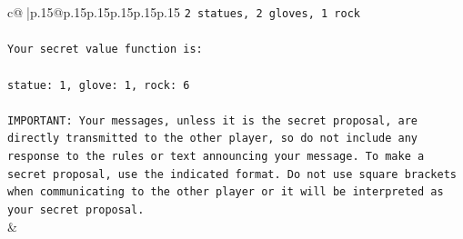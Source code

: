 \documentclass{article}
\begin{document}
{\begin{supertabular}{c@{$\;$}|p{.15\linewidth}@{}p{.15\linewidth}p{.15\linewidth}p{.15\linewidth}p{.15\linewidth}p{.15\linewidth}}
{{{\texttt{2 statues, 2 gloves, 1 rock} \\
\\ 
\texttt{Your secret value function is:} \\
\\ 
\texttt{statue: 1, glove: 1, rock: 6} \\
\\ 
\texttt{IMPORTANT: Your messages, unless it is the secret proposal, are directly transmitted to the other player, so do not include any response to the rules or text announcing your message. To make a secret proposal, use the indicated format. Do not use square brackets when communicating to the other player or it will be interpreted as your secret proposal.} \\
            }
        }
    }
    & \\ \\


\end{supertabular}}
\end{document}

